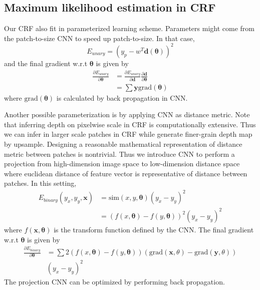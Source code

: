 \documentclass[10pt,twocolumn,letterpaper]{article}
\begin{document}
\subsection{Maximum likelihood estimation in CRF}
Our CRF also fit in parameterized learning scheme. Parameters might come from the patch-to-size CNN to speed up patch-to-size. In that case, 
\begin{equation}
E_{unary} = (y_p - w^T\mathbf{d}(\mathbf{\theta}))^2
\end{equation}
and the final gradient w.r.t $\mathbf{\theta}$ is given by
\begin{align}
\frac{\partial E_{unary}}{\partial \mathbf{\theta}} &= \frac{\partial E_{unary}}{\partial \mathbf{d}}\frac{\partial \mathbf{d}}{\partial \mathbf{\theta}}
\\ & = \sum \mathbf{y} \text{grad}(\mathbf{\theta})
\end{align}
where $\text{grad}(\mathbf{\theta})$ is calculated by back propagation in CNN.
\par
Another possible parameterization is by applying CNN as distance metric. Note that inferring depth on pixelwise scale in CRF is computationally extensive. Thus we can infer in larger scale patches in CRF while generate finer-grain depth map by upsample. Designing a reasonable mathematical representation of distance metric between patches is nontrivial. Thus we introduce CNN to perform a projection from high-dimension image space to low-dimension distance space where euclidean distance of feature vector is representative of distance between patches. In this setting, 
\begin{align}
E_{binary}(y_x, y_y, \mathbf{x}) &= \text{sim}(x, y, \mathbf{\theta}) (y_x-y_y)^2
\\ &= (f(x, \mathbf{\theta})-f(y, \mathbf{\theta}))^2(y_x-y_y)^2
\end{align}
where $f(\mathbf{x}, \mathbf{\theta})$ is the transform function defined by the CNN. The final gradient w.r.t $\mathbf{\theta}$ is given by
\begin{align}
\frac{\partial E_{binary}}{\partial \mathbf{\theta}} &=\sum 2(f(x, \mathbf{\theta})-f(y, \mathbf{\theta}))(\text{grad}(\mathbf{x}, \theta)-\text{grad}(\mathbf{y}, \theta))
\\& (y_x-y_y)^2
\end{align}
The projection CNN can be optimized by performing back propagation.

{\small


}
\end{document}
